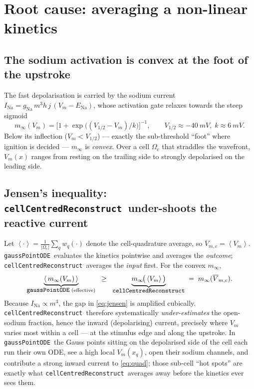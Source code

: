 \documentclass[11pt,a4paper]{article}
\newcommand{\Vm}{V_{m}}
\newcommand{\code}[1]{\texttt{\small #1}}
\newcommand{\gpode}{\code{gaussPointODE}}
\newcommand{\ccrec}{\code{cellCentredReconstruct}}
\newcommand{\Vbarc}{\overline{V}_{m,c}}
\newcommand{\avg}[1]{\left\langle #1 \right\rangle}
\newcommand{\Omegac}{\Omega_{c}}
\begin{document}
\section{Root cause: averaging a non-linear kinetics}

\subsection{The sodium activation is convex at the foot of the upstroke}

The fast depolarisation is carried by the sodium current
$I_{\mathrm{Na}}=g_{\mathrm{Na}}\,m^{3}h\,j\,(\Vm-E_{\mathrm{Na}})$, whose
activation gate relaxes towards the steep sigmoid
\begin{equation}
  m_\infty(\Vm)=\Big[1+\exp\!\big((V_{1/2}-\Vm)/k\big)\Big]^{-1},
  \qquad V_{1/2}\approx\SI{-40}{mV},\; k\approx\SI{6}{mV}.
\end{equation}
Below its inflection ($\Vm<V_{1/2}$) --- exactly the sub-threshold ``foot'' where
ignition is decided --- $m_\infty$ is \emph{convex}. Over a cell $\Omegac$ that
straddles the wavefront, $\Vm(x)$ ranges from resting on the trailing side to
strongly depolarised on the leading side.

\subsection{Jensen's inequality: \ccrec\ under-shoots the reactive current}

Let $\avg{\cdot}=\tfrac{1}{|\Omegac|}\sum_q w_q(\cdot)$ denote the cell-quadrature
average, so $\Vbarc=\avg{\Vm}$. \gpode\ evaluates the kinetics pointwise and
averages the \emph{outcome}; \ccrec\ averages the \emph{input} first. For the
convex $m_\infty$,
\begin{equation}
  \underbrace{\avg{\,m_\infty(\Vm)\,}}_{\text{\gpode\ (effective)}}
  \;\;\ge\;\;
  \underbrace{m_\infty\!\big(\avg{\Vm}\big)}_{\text{\ccrec}}
  \;=\; m_\infty(\Vbarc).
  \label{eq:jensen}
\end{equation}
Because $I_{\mathrm{Na}}\propto m^{3}$, the gap in \eqref{eq:jensen} is amplified
cubically. \ccrec\ therefore systematically \emph{under-estimates} the open-sodium
fraction, hence the inward (depolarising) current, precisely where $\Vm$ varies
most within a cell --- at the stimulus edge and along the upstroke. In \gpode\ the
Gauss points sitting on the depolarised side of the cell each run their own ODE,
see a high local $\Vm(x_q)$, open their sodium channels, and contribute a strong
inward current to \eqref{eq:quad}; those sub-cell ``hot spots'' are exactly what
\ccrec\ averages away before the kinetics ever sees them.
\end{document}
